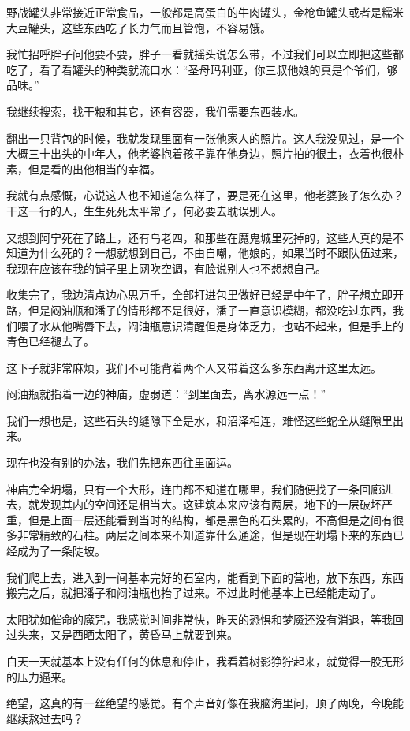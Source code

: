 野战罐头非常接近正常食品，一般都是高蛋白的牛肉罐头，金枪鱼罐头或者是糯米大豆罐头，这些东西吃了长力气而且管饱，不容易饿。

我忙招呼胖子问他要不要，胖子一看就摇头说怎么带，不过我们可以立即把这些都吃了，看了看罐头的种类就流口水：“圣母玛利亚，你三叔他娘的真是个爷们，够品味。”

我继续搜索，找干粮和其它，还有容器，我们需要东西装水。

翻出一只背包的时候，我就发现里面有一张他家人的照片。这人我没见过，是一个大概三十出头的中年人，他老婆抱着孩子靠在他身边，照片拍的很土，衣着也很朴素，但是看的出他相当的幸福。

我就有点感慨，心说这人也不知道怎么样了，要是死在这里，他老婆孩子怎么办？干这一行的人，生生死死太平常了，何必要去耽误别人。

又想到阿宁死在了路上，还有乌老四，和那些在魔鬼城里死掉的，这些人真的是不知道为什么死的？一想就想到自己，不由自嘲，他娘的，如果当时不跟队伍过来，我现在应该在我的铺子里上网吹空调，有脸说别人也不想想自己。

收集完了，我边清点边心思万千，全部打进包里做好已经是中午了，胖子想立即开路，但是闷油瓶和潘子的情形都不是很好，潘子一直意识模糊，都没吃过东西，我们喂了水从他嘴唇下去，闷油瓶意识清醒但是身体乏力，也站不起来，但是手上的青色已经褪去了。

这下子就非常麻烦，我们不可能背着两个人又带着这么多东西离开这里太远。

闷油瓶就指着一边的神庙，虚弱道：“到里面去，离水源远一点！”

我们一想也是，这些石头的缝隙下全是水，和沼泽相连，难怪这些蛇全从缝隙里出来。

现在也没有别的办法，我们先把东西往里面运。

神庙完全坍塌，只有一个大形，连门都不知道在哪里，我们随便找了一条回廊进去，就发现其内的空间还是相当大。这建筑本来应该有两层，地下的一层破坏严重，但是上面一层还能看到当时的结构，都是黑色的石头累的，不高但是之间有很多非常精致的石柱。两层之间本来不知道靠什么通途，但是现在坍塌下来的东西已经成为了一条陡坡。

我们爬上去，进入到一间基本完好的石室内，能看到下面的营地，放下东西，东西搬完之后，就把潘子和闷油瓶也抬了过来。不过此时他基本上已经能走动了。

太阳犹如催命的魔咒，我感觉时间非常快，昨天的恐惧和梦魇还没有消退，等我回过头来，又是西晒太阳了，黄昏马上就要到来。

白天一天就基本上没有任何的休息和停止，我看着树影狰狞起来，就觉得一股无形的压力逼来。

绝望，这真的有一丝绝望的感觉。有个声音好像在我脑海里问，顶了两晚，今晚能继续熬过去吗？

